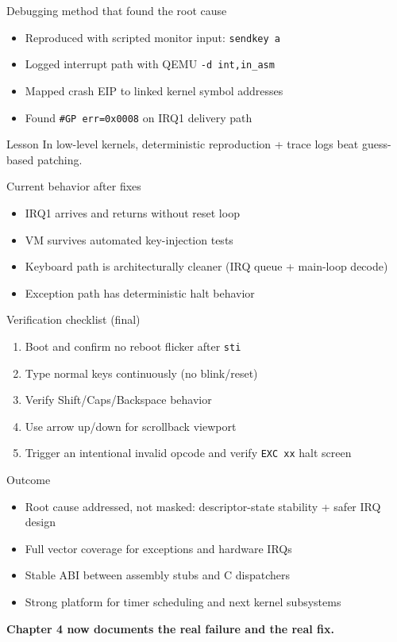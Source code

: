 \documentclass[aspectratio=169]{beamer}
\newcommand{\concept}[2]{%
  \begin{block}{#1}\smallskip #2\smallskip\end{block}\vspace{5pt}}
\begin{document}
\begin{frame}{Debugging method that found the root cause}
  \begin{itemize}
    \item Reproduced with scripted monitor input: \texttt{sendkey a}
    \item Logged interrupt path with QEMU \texttt{-d int,in\_asm}
    \item Mapped crash EIP to linked kernel symbol addresses
    \item Found \texttt{\#GP err=0x0008} on IRQ1 delivery path
  \end{itemize}
  \concept{Lesson}{
    In low-level kernels, deterministic reproduction + trace logs beat guess-based patching.
  }
\end{frame}

\begin{frame}{Current behavior after fixes}
  \begin{itemize}
    \item IRQ1 arrives and returns without reset loop
    \item VM survives automated key-injection tests
    \item Keyboard path is architecturally cleaner (IRQ queue + main-loop decode)
    \item Exception path has deterministic halt behavior
  \end{itemize}
\end{frame}

\begin{frame}{Verification checklist (final)}
  \begin{enumerate}
    \item Boot and confirm no reboot flicker after \texttt{sti}
    \item Type normal keys continuously (no blink/reset)
    \item Verify Shift/Caps/Backspace behavior
    \item Use arrow up/down for scrollback viewport
    \item Trigger an intentional invalid opcode and verify \texttt{EXC xx} halt screen
  \end{enumerate}
\end{frame}

\begin{frame}{Outcome}
  \begin{itemize}
    \item Root cause addressed, not masked: descriptor-state stability + safer IRQ design
    \item Full vector coverage for exceptions and hardware IRQs
    \item Stable ABI between assembly stubs and C dispatchers
    \item Strong platform for timer scheduling and next kernel subsystems
  \end{itemize}
  \vspace{8pt}
  \begin{center}
    \Large \textbf{Chapter 4 now documents the real failure and the real fix.}
  \end{center}
\end{frame}
\end{document}
